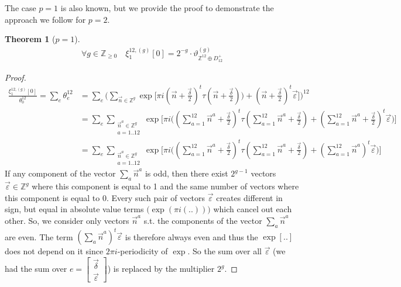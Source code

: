 \documentclass{article}
\newcommand{\ZZ}{\mathbb{Z}}
\newcommand{\ch}[2]{\left[\begin{array}{c}#1\\ #2 \end{array}\right]}
\newcommand{\de}{\delta}
\newcommand{\ep}{\varepsilon}
\theoremstyle{plain}
\newtheorem{theorem}{Theorem}[section]
\theoremstyle{definition}
\begin{document}
    The case $p=1$ is also known, but we provide the proof to demonstrate the approach
    we follow for $p=2$.

    \begin{theorem}[$p=1$]
        \begin{align}
            \forall g \in\mathbb{Z}_{\geq 0} \quad \xi_1^{12, (g)}[0] = 2^{-g} \cdot \vartheta^{(g)}_{\ZZ^{12} \oplus D_{12}^+}
        \end{align}
    \end{theorem}
    \begin{proof}
        \begin{align}
            \frac{\xi_1^{12, (g)}[0]}{\theta_0^{12}} = \sum_{e} \theta_e^{12}
            &= \sum_{e} \Big(\sum_{\vec{n} \in \ZZ^g}
                \exp \big[ \pi i 
                    (\vec{n} + \frac{\vec{\de}}{2})^t \tau (\vec{n} + \frac{{\vec{\de}}}{2}))
                    + (\vec{n} + \frac{\vec{\de}}{2})^t {\vec{\ep}}
                \big]
            \Big)^{12} \nonumber \\
            &= \sum_e \sum_{\substack{\vec{n}^a \in \ZZ^g \\ a=1..12}}
                \exp \big[
                    \pi i \Big(
                        (\sum_{a=1}^{12} \vec{n}^a + \frac{{\vec{\de}}}{2})^t \tau 
                        (\sum_{a=1}^{12} \vec{n}^a + \frac{{\vec{\de}}}{2})
                        + 
                        (\sum_{a=1}^{12} \vec{n}^a + \frac{{\vec{\de}}}{2})^t {\vec{\ep}}
                    \Big)
                \big] \nonumber \\
            &= \sum_e \sum_{\substack{\vec{n}^a \in \ZZ^g \\ a=1..12}}
                \exp \big[
                    \pi i \Big(
                        (\sum_{a=1}^{12} \vec{n}^a + \frac{{\vec{\de}}}{2})^t \tau 
                        (\sum_{a=1}^{12} \vec{n}^a + \frac{{\vec{\de}}}{2})
                        + 
                        (\sum_{a=1}^{12} \vec{n}^a)^t {\vec{\ep}}
                    \Big)
                \big]
        \end{align}
        If any component of the vector $\sum_{a} \vec n^a$ is odd, then 
        there exist $2^{g-1}$ vectors ${\vec{\ep}} \in \ZZ^g$ where
        this component is equal to 1 and the same number of vectors where 
        this component is equal to 0.
        Every such pair of vectors ${\vec{\ep}}$ creates different in sign, 
        but equal in absolute value terms $\big(\exp(\pi i(..))\big)$ which 
        cancel out each other. So, we consider only vectors $\vec n^a$ s.t.
        the components of the vector $\sum_a \vec n^a$ are even. 
        The term $(\sum_a \vec n^a)^t {\vec{\ep}}$ is therefore always even and thus the 
        $\exp[..]$ does not depend on it since $2\pi i$-periodicity of $\exp$. So the 
        sum over all ${\vec{\ep}}$ (we had the sum over $e=\ch{{\vec{\de}}}{{\vec{\ep}}}$)
        is replaced by the multiplier $2^g$.


\end{proof}
\end{document}

